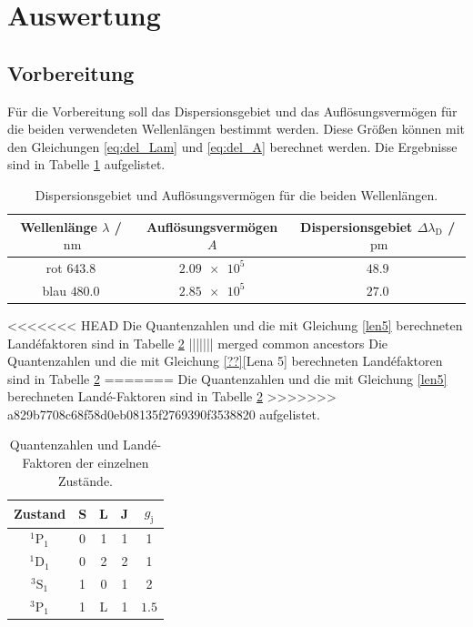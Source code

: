 \section{Auswertung}
\label{sec:Auswertung}
\subsection{Vorbereitung}
Für die Vorbereitung soll das Dispersionsgebiet und das Auflösungsvermögen für die beiden 
verwendeten Wellenlängen bestimmt werden. Diese Größen können mit den Gleichungen \eqref{eq:del_Lam} und \eqref{eq:del_A} berechnet werden.
Die Ergebnisse sind in Tabelle \ref{tab:Vorbereitung} aufgelistet.
\FloatBarrier
\begin{table}
    \centering
    \caption{Dispersionsgebiet und Auflösungsvermögen für die beiden Wellenlängen.}
    \label{tab:Vorbereitung}
    \begin{tabular}{c c c}
        \toprule
        Wellenlänge $\lambda$ / $\SI{}{\nano\meter}$&Auflösungsvermögen $A$& Dispersionsgebiet $\Delta \lambda_{\text{D}}$ / $\SI{}{\pico\meter}$\\
        \midrule
        rot $\num{643.8}$&$\num{2.09e5}$&$\num{48.9}$\\
        blau $\num{480.0}$&$\num{2.85e5}$&$\num{27.0}$\\
        \bottomrule
    \end{tabular}
\end{table}
\FloatBarrier
<<<<<<< HEAD
Die Quantenzahlen und die mit Gleichung \eqref{len5} berechneten Landéfaktoren sind in Tabelle \ref{tab:Quantenzahlen} 
||||||| merged common ancestors
Die Quantenzahlen und die mit Gleichung \eqref{??}[Lena 5] berechneten Landéfaktoren sind in Tabelle \ref{tab:Quantenzahlen} 
=======
Die Quantenzahlen und die mit Gleichung \eqref{len5} berechneten Landé-Faktoren sind in Tabelle \ref{tab:Quantenzahlen} 
>>>>>>> a829b7708c68f58d0eb08135f2769390f3538820
aufgelistet.
\FloatBarrier
\begin{table}
    \centering
    \caption{Quantenzahlen und Landé-Faktoren der einzelnen Zustände.}
    \label{tab:Quantenzahlen}
    \begin{tabular}{c c c c c}
        \toprule
        Zustand&S&L&J&$g_{\text{j}}$\\
        \midrule
        $^1\text{P}_1$&0&1&1&1\\
        $^1\text{D}_1$&0&2&2&1\\
        $^3\text{S}_1$&1&0&1&2\\
        $^3\text{P}_1$&1&L&1&$\num{1.5}$\\
        \bottomrule
    \end{tabular}
\end{table}
